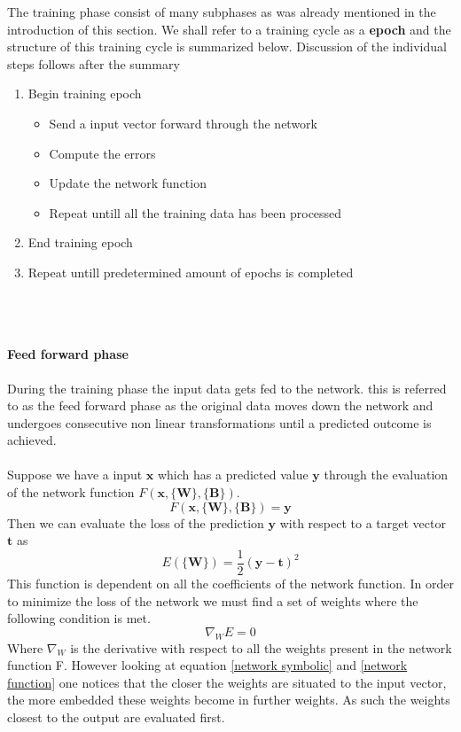 \documentclass[12pt]{article}
\begin{document}
The training phase consist of many subphases as was already mentioned in the introduction of this section. We shall refer to a training cycle as a \textbf{epoch} and the structure of this training cycle is summarized below. Discussion of the individual steps follows after the summary
\begin{enumerate}
	\item Begin training epoch
	\begin{itemize}
		\item Send a input vector forward through the network
		\item Compute the errors
		\item Update the network function
		\item Repeat untill all the training data has been processed
	\end{itemize}	
	\item End training epoch
	\item Repeat untill predetermined amount of epochs is completed
\end{enumerate}
\\
\\
\paragraph{Feed forward phase}
During the training phase the input data gets fed to the network. this is referred to as the feed forward phase as the original data moves down the network and undergoes consecutive non linear transformations until a predicted outcome is achieved.  
\\
\\
Suppose we have a input $\textbf{x}$ which has a predicted value $\textbf{y}$ through the evaluation of the network function $F\left(\textbf{x}, \{\textbf{W}\}, \{\textbf{B}\} \right)$.
\begin{equation*}
F\left(\textbf{x}, \{\textbf{W}\}, \{\textbf{B}\} \right) = \textbf{y}
\end{equation*}
Then we can evaluate the loss of the prediction $\textbf{y}$ with respect to a target vector $\textbf{t}$ as \cite{Bishop2013} \cite{Hastie}
\begin{equation}
E\left(\{\textbf{W}\}\right) = \frac{1}{2} \left( \textbf{y} - \textbf{t} \right)^2
\end{equation}
This function is dependent on all the coefficients of the network function. In order to minimize the loss of the network we must find a set of weights where the following condition is met. 
\begin{equation}
\nabla_{W}E = 0
\end{equation}
Where $\nabla_{W}$ is the derivative with respect to all the weights present in the network function F. However looking at equation \ref{network symbolic} and \ref{network function} one notices that the closer the weights are situated to the input vector, the more embedded these weights become in further weights. As such the weights closest to the output are evaluated first. 
\end{document}
